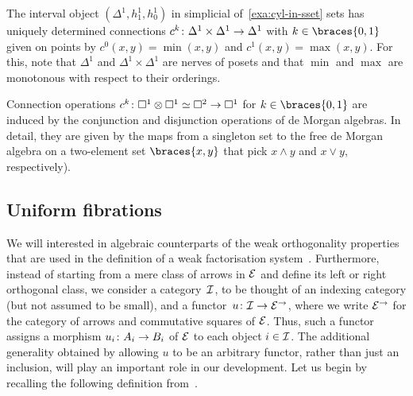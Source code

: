 \documentclass[reqno,10pt,a4paper,oneside,draft]{amsart}
\begin{document}
\begin{example}
The interval object $(\Delta^1, h_1^1, h_0^1)$ in simplicial of~\cref{exa:cyl-in-sset} sets has uniquely determined connections $c^k \co \Delta^1 \times \Delta^1 \to \Delta^1$ with $k \in \braces{0, 1}$ given on points by $c^0(x, y) = \min(x, y)$ and $c^1(x, y) = \max(x, y)$.
For this, note that $\Delta^1$ and $\Delta^1 \times \Delta^1$ are nerves of posets and that $\min$ and $\max$ are monotonous with respect to their orderings.
\end{example}

\begin{example}
Connection operations $c^k \co \Box^1 \otimes \Box^1 \simeq \Box^2 \to \Box^1$ for $k \in \braces{0, 1}$ are induced by the conjunction and disjunction operations of de Morgan algebras.
In detail, they are given by the maps from a singleton set to the free de Morgan algebra on a two-element set $\braces{x, y}$ that pick $x \wedge y$ and $x \vee y$, respectively).
\end{example}

\subsection*{Uniform fibrations}
We will interested in algebraic counterparts of the weak orthogonality properties that are used in the definition of a weak factorisation system~\cite{bousfield-wfs}.
Furthermore, instead of starting from a mere class of arrows in $\catE$ and define its left or right orthogonal class, we consider a category~$\cal{I}$, to be thought of an indexing category (but not assumed to be small), and a functor~$u \co \cal{I} \to \catE^\to$, where we write $\catE^\to$ for the category of arrows and commutative squares of $\catE$.
Thus, such a functor assigns a morphism $u_i \co A_i \to B_i$ of $\catE$ to each object $i \in \cal{I}$.
The additional generality obtained by allowing $u$ to be an arbitrary functor, rather than just an inclusion, will play an important role in our development.
Let us begin by recalling the following definition from~\cite{garner:small-object-argument}.
\end{document}
